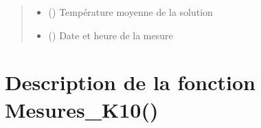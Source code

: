 \documentclass[letterpaper,10pt,french]{sphinxmanual}
\begin{document}
\begin{fulllineitems}
\begin{quote}
\begin{description}
\begin{itemize}
\item {} 
\sphinxAtStartPar
{} () \textendash{} Température moyenne de la solution

\item {} 
\sphinxAtStartPar
{} () \textendash{} Date et heure de la mesure

\end{itemize}


\end{description}\end{quote}

\end{fulllineitems}



\section{Description de la fonction Mesures\_K10()}
\label{\detokenize{Documentation:description-de-la-fonction-mesures-k10}}
\end{document}
